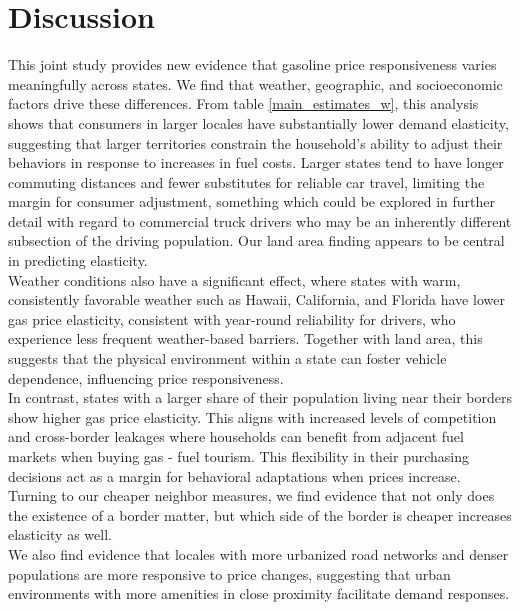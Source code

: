 \section{Discussion}
This joint study provides new evidence that gasoline price responsiveness varies meaningfully across states. We find that weather, geographic, and socioeconomic factors drive these differences. From table \ref{main_estimates_w}, this analysis shows that consumers in larger locales have substantially lower demand elasticity, suggesting that larger territories constrain the household's ability to adjust their behaviors in response to increases in fuel costs. Larger states tend to have longer commuting distances and fewer substitutes for reliable car travel, limiting the margin for consumer adjustment, something which could be explored in further detail with regard to commercial truck drivers who may be an inherently different subsection of the driving population. Our land area finding appears to be central in predicting elasticity. \\

Weather conditions also have a significant effect, where states with warm, consistently favorable weather such as Hawaii, California, and Florida have lower gas price elasticity, consistent with year-round reliability for drivers, who experience less frequent weather-based barriers. Together with land area, this suggests that the physical environment within a state can foster vehicle dependence, influencing price responsiveness. \\ 

In contrast, states with a larger share of their population living near their borders show higher gas price elasticity. This aligns with increased levels of competition and cross-border leakages where households can benefit from adjacent fuel markets when buying gas - fuel tourism. This flexibility in their purchasing decisions act as a margin for behavioral adaptations when prices increase. Turning to our cheaper neighbor measures, we find evidence that not only does the existence of a border matter, but which side of the border is cheaper increases elasticity as well. \\

We also find evidence that locales with more urbanized road networks and denser populations are more responsive to price changes, suggesting that urban environments with more amenities in close proximity facilitate demand responses. \\

